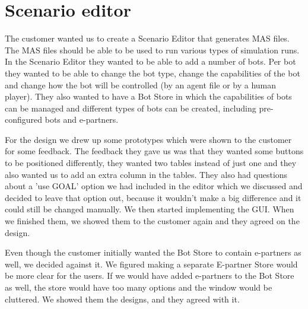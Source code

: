 \section{Scenario editor}
The customer wanted us to create a Scenario Editor that generates MAS files. The MAS files should be able to be used to run various types of simulation runs. In the Scenario Editor they wanted to be able to add a number of bots. Per bot they wanted to be able to change the bot type, change the capabilities of the bot and change how the bot will be controlled (by an agent file or by a human player). They also wanted to have a Bot Store in which the capabilities of bots can be managed and different types of bots can be created, including pre-configured bots and e-partners.

For the design we drew up some prototypes which were shown to the customer for some feedback. The feedback they gave us was that they wanted some buttons to be positioned differently, they wanted two tables instead of just one and they also wanted us to add an extra column in the tables. They also had questions about a 'use GOAL' option we had included in the editor which we discussed and decided to leave that option out, because it wouldn't make a big difference and it could still be changed manually. We then started implementing the GUI. When we finished them, we showed them to the customer again and they agreed on the design.

Even though the customer initially wanted the Bot Store to contain e-partners as well, we decided against it. We figured making a separate E-partner Store would be more clear for the users. If we would have added e-partners to the Bot Store as well, the store would have too many options and the window would be cluttered. We showed them the designs, and they agreed with it.
